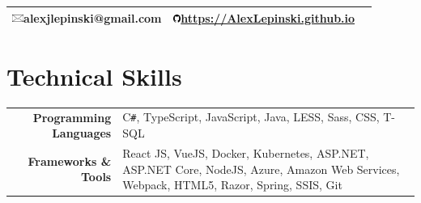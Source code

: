\documentclass[10pt]{article}
\newcommand{\emailicon}{\includegraphics[height=2.4mm,keepaspectratio]{emailicon.jpg}}
\newcommand{\githubicon}{\includegraphics[height=2.6mm,keepaspectratio]{githubicon.png}}
\begin{document}
\pagestyle{empty} %

\par{\par}

\begin{center}{\def\arraystretch{1.5}
\begin{tabular}{ccc}
    \hline\hline
    \emailicon  \space alexjlepinski@gmail.com &
    \githubicon \space \url{https://AlexLepinski.github.io}\\
	\hline\hline
\end{tabular}
}\end{center}

\vspace*{-\baselineskip}
\vspace{3mm}


\vspace*{-\baselineskip}
\vspace{5mm}

\section{Technical Skills}

\begin{tabular}{rp{13.1cm}}
\textbf{\space Programming Languages}
	&  \textsc{C\texttt{\#}}, TypeScript, JavaScript,
    Java, LESS, Sass, CSS, T-SQL\\
\textbf{\space Frameworks \& Tools}
	& React JS, VueJS, Docker, Kubernetes,  ASP.NET, ASP.NET Core, NodeJS, Azure, Amazon Web Services, Webpack, HTML5, Razor, Spring, SSIS, Git \\
\end{tabular}
\vspace*{-\baselineskip}
\vspace{3mm}

\vspace*{-\baselineskip}
\vspace{3mm}
\end{document}
